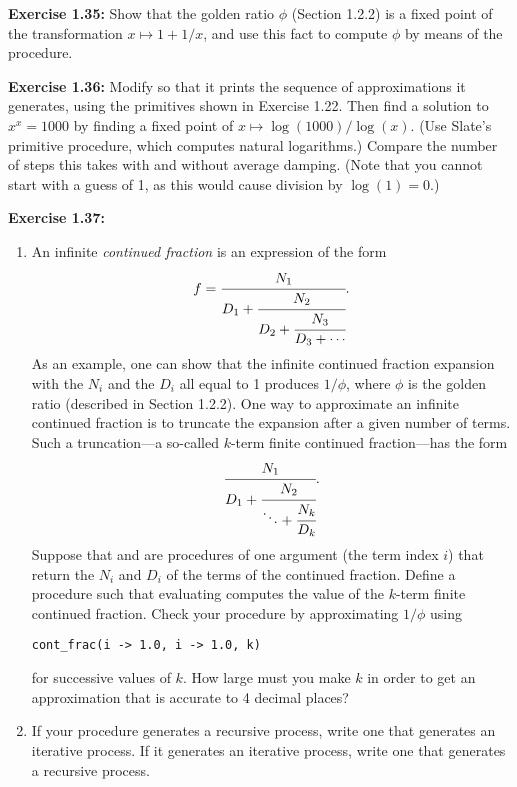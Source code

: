 \textbf{Exercise 1.35:} Show that the golden ratio $\phi$ (Section 1.2.2) is a fixed point of the transformation $x \mapsto 1 + 1/x$, and use this fact to compute $\phi$ by means of the  procedure.

\textbf{Exercise 1.36:} Modify  so that it prints the sequence of approximations it generates, using the  primitives shown in Exercise 1.22. Then find a solution to $x^x = 1000$ by finding a fixed point of $x \mapsto \log(1000)/\log(x)$. (Use Slate's primitive  procedure, which computes natural logarithms.) Compare the number of steps this takes with and without average damping. (Note that you cannot start  with a guess of 1, as this would cause division by $\log(1) = 0$.)

\textbf{Exercise 1.37:}
\begin{enumerate}
\item An infinite \emph{continued fraction} is an expression of the form
\[
f = \cfrac{N_1}{D_1 + \cfrac{N_2}{D_2 + \cfrac{N_3}{D_3 + \cdots}}}.
\]
As an example, one can show that the infinite continued fraction expansion with the $N_i$ and the $D_i$ all equal to 1 produces $1/\phi$, where $\phi$ is the golden ratio (described in Section 1.2.2). One way to approximate an infinite continued fraction is to truncate the expansion after a given number of terms. Such a truncation---a so-called $k$-term finite continued fraction---has the form
\[
\cfrac{N_1}{D_1 + \cfrac{N_2}{\ddots + \cfrac{N_k}{D_k}}}.
\]
Suppose that  and  are procedures of one argument (the term index $i$) that return the $N_i$ and $D_i$ of the terms of the continued fraction. Define a procedure  such that evaluating  computes the value of the $k$-term finite continued fraction. Check your procedure by approximating $1/\phi$ using

\begin{lstlisting}[style=slate]
cont_frac(i -> 1.0, i -> 1.0, k)
\end{lstlisting}

for successive values of $k$. How large must you make $k$ in order to get an approximation that is accurate to 4 decimal places?

\item If your  procedure generates a recursive process, write one that generates an iterative process. If it generates an iterative process, write one that generates a recursive process.
\end{enumerate}

